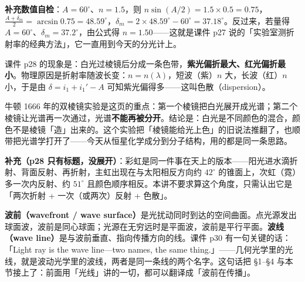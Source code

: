 \documentclass[11pt]{ctexart}
\begin{document}

\textbf{补充数值自检}：$A=60^\circ$、$n=1.5$，则 $n\sin(A/2)=1.5\times0.5=0.75$，$\frac{A+\delta_m}{2}=\arcsin0.75=48.59^\circ$，$\delta_m=2\times48.59^\circ-60^\circ=37.18^\circ$。反过来，若量得 $A=60^\circ$、$\delta_m=37.2^\circ$，由公式得 $n=1.50$——这就是课件 p27 说的「实验室测折射率的经典方法」，它一直用到今天的分光计上。

课件 p28 的现象是：白光过棱镜后分成一条色带，\textbf{紫光偏折最大、红光偏折最小}。物理原因是折射率随波长变：$n=n(\lambda)$，短波（紫）$n$ 大，长波（红）$n$ 小，于是由 $\delta=i_1+i_1'-A$ 可知紫光偏得多——这叫色散（dispersion）。

牛顿 1666 年的双棱镜实验是这页的重点：第一个棱镜把白光展开成光谱；第二个棱镜让光谱再一次通过，光谱\textbf{不能再被分开}。结论是：白光是不同颜色的混合，颜色不是棱镜「造」出来的。这个实验把「棱镜能给光上色」的旧说法推翻了，也顺带把光谱学打开了——今天从恒星化学成分到分子结构，用的都是同一条思路。

\textbf{补充（p28 只有标题，没展开）}：彩虹是同一件事在天上的版本——阳光进水滴折射、背面反射、再折射，主虹出现在与太阳相反方向约 $42^\circ$ 的锥面上，次虹（霓）多一次内反射、约 $51^\circ$ 且颜色顺序相反。本讲不要求算这个角度，只需认出它是「两次折射 + 一次（或两次）反射 + 色散」。


\textbf{波前（wavefront / wave surface）}是光扰动同时到达的空间曲面。点光源发出球面波，波前是同心球面；光源在无穷远时是平面波，波前是平行平面。\textbf{波线（wave line）}是与波前垂直、指向传播方向的线。课件 p30 有一句关键的话：「Light ray is the wave line---two names, the same thing.」——几何光学里的光线，就是波动光学里的波线，两者是同一条线的两个名字。这句话把 §1--§4 与本节接上了：前面用「光线」讲的一切，都可以翻译成「波前在传播」。
\end{document}
